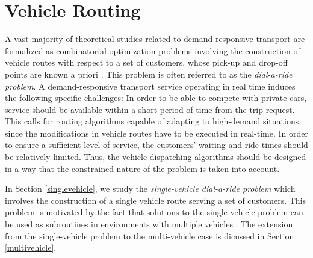 \documentclass[dissertation,draft*]{aaltoseries}
\begin{document}





\chapter{Vehicle Routing}
\label{vehiclerouting}
A vast majority of theoretical studies related to demand-responsive transport are formalized as combinatorial
optimization problems involving the construction of vehicle routes with respect to
a set of customers, whose pick-up and drop-off points are known a priori \cite{toth03}.
This problem is often referred to as the \emph{dial-a-ride problem}.
A demand-responsive transport service operating in real time induces the following specific challenges: 
In order to be able to compete with private cars, service
should be available within a short period of time from the trip request.
This calls for routing algorithms capable of adapting to high-demand situations, since the modifications 
in vehicle routes have to be executed in real-time.
In order to ensure a sufficient level of service, the customers' waiting and ride times 
should be relatively limited. Thus, the vehicle dispatching algorithms should be designed
in a way that the constrained nature of the problem is taken into account.

In Section \ref{singlevehicle}, we study the \emph{single-vehicle dial-a-ride problem} which involves the construction
of a single vehicle route serving a set of customers. This problem is motivated by the
fact that solutions to the single-vehicle problem can be used as subroutines in environments with 
multiple vehicles \cite{psaraftis01,psaraftis02}. The extension from the single-vehicle problem to the multi-vehicle
case is dicussed in Section \ref{multivehicle}.
\end{document}
